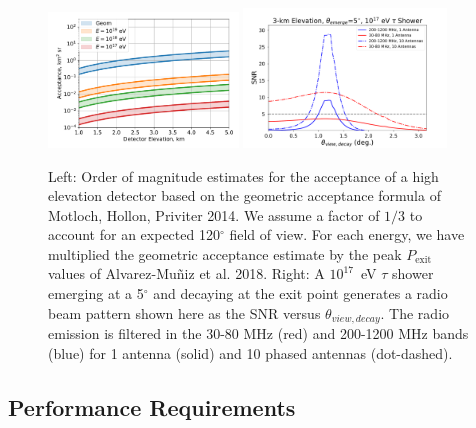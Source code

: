 \documentclass[12pt]{article}
\begin{document}
\begin{figure}[!h]
{\includegraphics[width=0.45\textwidth]{figures/Crude_Estimate.pdf}}
{\includegraphics[width=0.48\textwidth]{figures/SNR_example_emerge5deg_10antenna.pdf}}
\caption{Left: Order of magnitude estimates for the acceptance of a high elevation detector based on the geometric acceptance formula of Motloch, Hollon, Priviter 2014. We assume a factor of $1/3$ to account for an expected 120$^\circ$ field of view. For each energy, we have multiplied the geometric acceptance estimate by the peak $P_\mathrm{exit}$ values of Alvarez-Mu\~niz et al. 2018. Right: A $10^{17}$~eV $\tau$ shower emerging at a 5$^{\circ}$ and decaying at the exit point generates a radio beam pattern shown here as the SNR versus $\theta_{view,decay}$.  The radio emission is filtered in the 30-80 MHz (red) and 200-1200 MHz bands (blue) for 1 antenna (solid) and 10 phased antennas (dot-dashed).   }
\label{fig:crude_estimate}
\end{figure}


\subsection{Performance Requirements}
\end{document}
